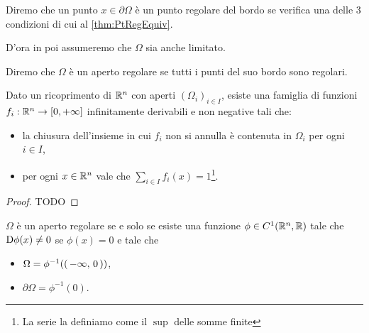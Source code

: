 \begin{definition}
	Diremo che un punto $x\in \partial \Omega$ è un punto regolare del bordo se verifica una delle $3$ condizioni di cui
	al \cref{thm:PtRegEquiv}.
\end{definition}

D'ora in poi assumeremo che $\Omega$ sia anche limitato.

\begin{definition}
	Diremo che $\Omega$ è un aperto regolare se tutti i punti del suo bordo sono regolari.
\end{definition}


\begin{theorem}\label{thm:PartizioneUnita}
	Dato un ricoprimento di $\mathbb R^n$ con aperti $(\Omega_i)_{i\in I}$, esiste una famiglia di funzioni $f_i:\mathbb R^n\to[0,+\infty]$ infinitamente derivabili
	e non negative tali che:
	\begin{itemize}
		\item la chiusura dell'insieme in cui $f_i$ non si annulla è contenuta in $\Omega_i$ per ogni $i\in I$,
		\item per ogni $x\in\mathbb R^n$ vale che $\sum_{i\in I} f_i(x)=1$\footnote{La serie la definiamo come il $\sup$ delle somme finite}.
	\end{itemize}
\end{theorem}
\begin{proof}
	TODO
\end{proof}

\begin{lemma}\label{lem:EquivRegolare}
	$\Omega$ è un aperto regolare se e solo se esiste una funzione $\phi\in C^1(\mathbb R^n,\mathbb R)$ tale che $\mathrm D \phi(x)\neq 0$ se $\phi(x)=0$ e tale che
	\begin{itemize}
		\item $\Omega = \phi^{-1}(\left(\,-\infty,\,0\,\right))$,
		\item $\partial \Omega = \phi^{-1}(0)$.
	\end{itemize}
\end{lemma}

